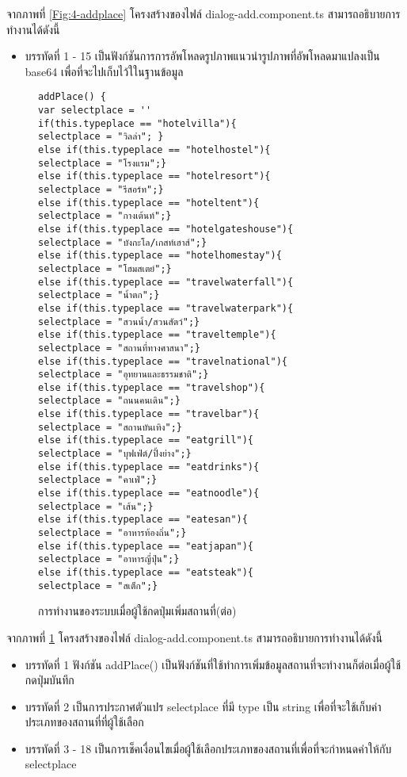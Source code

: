 จากภาพที่ \ref{Fig:4-addplace} โครงสร้างของไฟล์ dialog-add.component.ts สามารถอธิบายการทำงานได้ดังนี้
\begin{itemize}[label={--}]
\item บรรทัดที่ 1 - 15 เป็นฟังก์ชันการการอัพโหลดรูปภาพแนวนำรูปภาพที่อัพโหลดมาแปลงเป็น base64 เพื่อที่จะไปเก็บไว้ใในฐานข้อมูล 
\end{itemize}
\newpage

\begin{figure}[H]
{\lstset{language=Pascal}
\begin{lstlisting}
addPlace() {
var selectplace = ''
if(this.typeplace == "hotelvilla"){
selectplace = "วิลล่า"; }
else if(this.typeplace == "hotelhostel"){
selectplace = "โรงแรม";}
else if(this.typeplace == "hotelresort"){
selectplace = "รีสอร์ท";}
else if(this.typeplace == "hoteltent"){
selectplace = "กางเต้นท์";}
else if(this.typeplace == "hotelgateshouse"){
selectplace = "บังกะโล/เกสท์เฮาส์";}
else if(this.typeplace == "hotelhomestay"){
selectplace = "โฮมสเตย์";}
else if(this.typeplace == "travelwaterfall"){
selectplace = "น้ำตก";}
else if(this.typeplace == "travelwaterpark"){
selectplace = "สวนน้ำ/สวนสัตว์";}
else if(this.typeplace == "traveltemple"){
selectplace = "สถานที่ทางศาสนา";}
else if(this.typeplace == "travelnational"){
selectplace = "อุทยานและธรรมชาติ";}
else if(this.typeplace == "travelshop"){
selectplace = "ถนนคนเดิน";}
else if(this.typeplace == "travelbar"){
selectplace = "สถานบันเทิง";}
else if(this.typeplace == "eatgrill"){
selectplace = "บุฟเฟ่ต์/ปิ้งย่าง";}
else if(this.typeplace == "eatdrinks"){
selectplace = "คาเฟ่";}
else if(this.typeplace == "eatnoodle"){
selectplace = "เส้น";}
else if(this.typeplace == "eatesan"){
selectplace = "อาหารท้องถิ่น";}
else if(this.typeplace == "eatjapan"){
selectplace = "อาหารญี่ปุ่น";}
else if(this.typeplace == "eatsteak"){
selectplace = "สเต็ก";}
\end{lstlisting}}
\caption{การทำงานของระบบเมื่อผู้ใช้กดปุ่มเพิ่มสถานที่(ต่อ)}
\label{Fig:4-addplace1}
\end{figure}
\newpage

จากภาพที่ \ref{Fig:4-addplace1} โครงสร้างของไฟล์ dialog-add.component.ts สามารถอธิบายการทำงานได้ดังนี้
\begin{itemize}[label={--}]
\item บรรทัดที่ 1 ฟังก์ชัน addPlace() เป็นฟังก์ชันที่ใช้ทำการเพิ่มข้อมูลสถานที่จะทำงานก็ต่อเมื่อผู้ใช้กดปุ่มบันทึก
\item บรรทัดที่ 2 เป็นการประกาศตัวแปร selectplace ที่มี type เป็น string เพื่อที่จะใช้เก็บค่าประเภทของสถานที่ที่ผู้ใช้เลือก
\item บรรทัดที่ 3 - 18 เป็นการเช็คเงื่อนไขเมื่อผู้ใช้เลือกประเภทของสถานที่เพื่อที่จะกำหนดค่าให้กับ selectplace 
\end{itemize}

